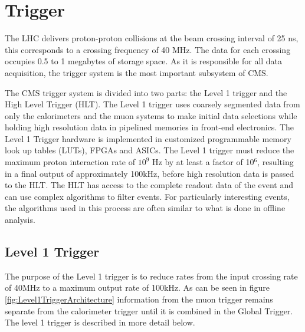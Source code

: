 \section{Trigger}%
The LHC delivers proton-proton collisions at the beam crossing 
interval of 25 ns, this corresponds to a crossing frequency of 40 MHz.
The data for each crossing occupies 0.5 to 1 megabytes of storage space.
As it is responsible for all data acquisition, 
the trigger system is the most important subsystem of CMS. 

The CMS trigger system is divided into two parts: the Level 1 trigger 
and the High Level Trigger (HLT). 
The Level 1 trigger uses coarsely segmented
data from only the calorimeters and the muon systems to make initial
data selections while holding high resolution data in pipelined memories
in front-end electronics. The Level 1 Trigger hardware is implemented in customized
programmable memory look up tables (LUTs), FPGAs and ASICs.
The Level 1 trigger must reduce the maximum proton interaction rate of $10^{9}$ Hz 
by at least a factor of 10$^{6}$, 
resulting in a final output of approximately 100kHz,
before high resolution data is passed to the HLT.
The HLT has access to the complete readout data of the event and can use
complex algorithms to filter events. For particularly interesting events, 
the algorithms used in this process are often similar to what is done in 
offline analysis. 
  \subsection{Level 1 Trigger} %
The purpose of the Level 1 trigger is to reduce rates from the input
crossing rate of 40MHz to a maximum output rate of 100kHz. 
As can be seen in figure \ref{fig:Level1TriggerArchitecture} information from the muon trigger remains separate from the calorimeter trigger
until it is combined in the Global Trigger. The level 1 trigger is described in more detail below.

